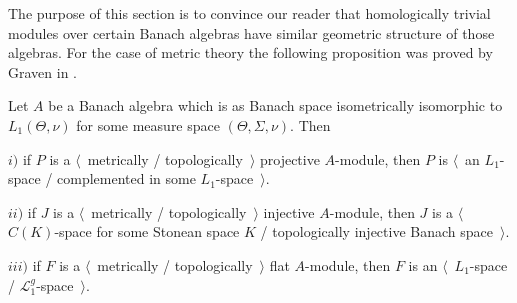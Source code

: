 The purpose of this section is to convince our reader that homologically trivial modules over certain Banach algebras have similar geometric structure of those algebras. For the case of metric theory the following proposition was proved by Graven in \cite{GravInjProjBanMod}.

\begin{proposition}\label{TopProjInjFlatModOverL1Charac} Let $A$ be a Banach algebra which is as Banach space isometrically isomorphic to $L_1(\Theta,\nu)$ for some measure space $(\Theta,\Sigma,\nu)$. Then

$i)$ if $P$ is a $\langle$~metrically / topologically~$\rangle$ projective $A$-module, then $P$ is $\langle$~an $L_1$-space / complemented in some $L_1$-space~$\rangle$.

$ii)$ if $J$ is a $\langle$~metrically / topologically~$\rangle$ injective $A$-module, then  $J$ is a $\langle$~$C(K)$-space for some Stonean space $K$ / topologically injective Banach space~$\rangle$.

$iii)$ if $F$ is a $\langle$~metrically / topologically~$\rangle$ flat $A$-module, then $F$ is an $\langle$~$L_1$-space / $\mathscr{L}_1^g$-space~$\rangle$.
\end{proposition}

